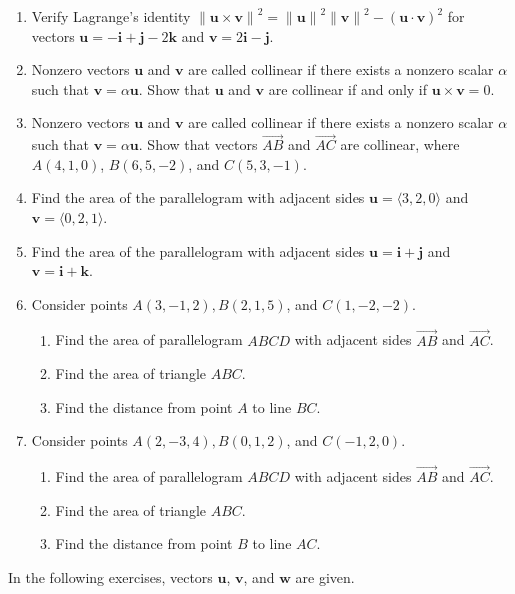 \documentclass{exercises}
\begin{document}
\begin{enumerate}[resume]
\item Verify Lagrange's identity ${\|\mathbf{u}\times \mathbf{v}\|}^{2}={\|\mathbf{u}\|}^{2}{\|\mathbf{v}\|}^{2}-{(\mathbf{u}\cdot \mathbf{v})}^{2}$ for vectors $\mathbf{u}=-\mathbf{i}+\mathbf{j}-2\mathbf{k}$ and $\mathbf{v}=2\mathbf{i}-\mathbf{j}$.
\item Nonzero vectors $\mathbf{u}$ and $\mathbf{v}$ are called collinear if there exists a nonzero scalar $\alpha$ such that $\mathbf{v}=\alpha \mathbf{u}$. Show that $\mathbf{u}$ and $\mathbf{v}$ are collinear if and only if $\mathbf{u}\times \mathbf{v}=0$.
\item Nonzero vectors $\mathbf{u}$ and $\mathbf{v}$ are called collinear if there exists a nonzero scalar $\alpha$ such that $\mathbf{v}=\alpha \mathbf{u}$. Show that vectors $\overset{\to}{AB}$ and $\overset{\to}{AC}$ are collinear, where $A(4,1,0)$, $B(6,5,-2)$, and $C(5,3,-1)$.
\item Find the area of the parallelogram with adjacent sides $\mathbf{u}=\langle3,2,0\rangle$ and $\mathbf{v}=\langle0,2,1\rangle$.
\item Find the area of the parallelogram with adjacent sides $\mathbf{u}=\mathbf{i}+\mathbf{j}$ and $\mathbf{v}=\mathbf{i}+\mathbf{k}$.
\item Consider points $A(3,-1,2),B(2,1,5)$, and $C(1,-2,-2)$.
\begin{enumerate}[label=(\alph*)]
  \item Find the area of parallelogram $ABCD$ with adjacent sides $\overset{\to}{AB}$ and $\overset{\to}{AC}$.
  \item Find the area of triangle $ABC$.
  \item Find the distance from point $A$ to line $BC$.
\end{enumerate}
\item Consider points $A(2,-3,4),B(0,1,2)$, and $C(-1,2,0)$.
\begin{enumerate}[label=(\alph*)]
  \item Find the area of parallelogram $ABCD$ with adjacent sides $\overset{\to}{AB}$ and $\overset{\to}{AC}$.
  \item Find the area of triangle $ABC$.
  \item Find the distance from point $B$ to line $AC$.
\end{enumerate}
\end{enumerate}

In the following exercises, vectors $\mathbf{u}$, $\mathbf{v}$, and $\mathbf{w}$ are given.
\end{document}
